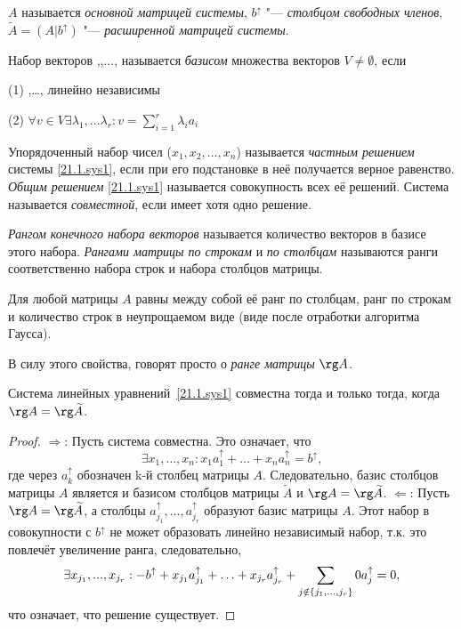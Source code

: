 $A$ называется \textit{основной матрицей системы}, $b^\uparrow$ "--- \textit{столбцом свободных членов}, $\widetilde A = (A|b^\uparrow)$ "--- \textit{расширенной матрицей системы}.
\begin{defn}
Набор векторов ,,..., называется \textit{базисом} множества векторов $V\neq \emptyset$, если

(1) ,\ldots, линейно независимы

(2) $\forall v \in V \exists \lambda_1,...\lambda_r: v=\sum \limits_{i=1}^r\lambda_ia_i$
\end{defn}

\begin{defn}
Упорядоченный набор чисел ($x_1, x_2, \ldots, x_n$) называется \textit{частным решением} системы \eqref{21.1.sys1}, если при его подстановке в неё получается верное равенство. \textit{Общим решением} \eqref{21.1.sys1} называется совокупность всех её решений. Система называется \textit{совместной}, если имеет хотя одно решение.
\end{defn}
\begin{defn}
\textit{Рангом конечного набора векторов} называется количество векторов в базисе этого набора. \textit{Рангами матрицы по строкам} и \textit{по столбцам} называются ранги соответственно набора строк и набора столбцов матрицы.
\end{defn}
\begin{lemm} 
Для любой матрицы $A$ равны между собой её ранг по столбцам, ранг по строкам и количество строк в неупрощаемом виде (виде после отработки алгоритма Гаусса).
\end{lemm}
В силу этого свойства, говорят просто о \textit{ранге матрицы} $\rg A$.
\begin{thm}
Система линейных уравнений~\eqref{21.1.sys1} совместна тогда и только тогда, когда $\rg A = \rg \widetilde A$.
\end{thm}
\begin{proof}
$\Rightarrow$: Пусть система совместна. Это означает, что
\begin{equation*}
\exists x_1,\ldots, x_n: x_1a_1^\uparrow +\ldots+x_na_n^\uparrow=b^\uparrow,
\end{equation*}
где через $a_k^\uparrow$ обозначен k-й столбец матрицы $A$. Следовательно, базис столбцов матрицы $A$  является и базисом столбцов матрицы $\widetilde A$ и $\rg A = \rg \widetilde A$.
$\Leftarrow$: Пусть $\rg A = \rg \widetilde A$, а столбцы $a_{j_1}^\uparrow,...,a_{j_r}^\uparrow$ образуют базис матрицы $A$. Этот набор в совокупности с $b^\uparrow$ не может образовать линейно независимый набор, т.к. это повлечёт увеличение ранга, следовательно, 
\begin{equation*}\\ 
\exists x_{j_1},...,x_{j_r}: -b^\uparrow+x_{j_1}a_{j_1}^\uparrow+\ldots+x_{j_r}a_{j_r}^\uparrow+\sum_{j \notin \{j_1,...,j_r\}}0 a_j^\uparrow = 0,
\end{equation*} 
что означает, что решение существует.
\end{proof}

